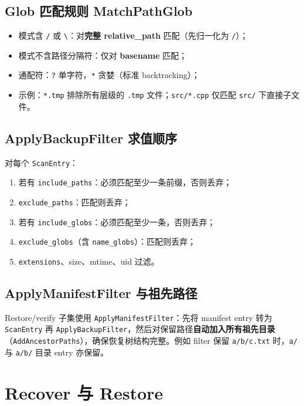 \subsection{Glob 匹配规则 MatchPathGlob}

\begin{designbox}[Glob 语义（关键）]
\begin{itemize}[nosep]
  \item 模式含 \texttt{/} 或 \texttt{\textbackslash}：对\textbf{完整 relative\_path} 匹配（先归一化为 \texttt{/}）；
  \item 模式不含路径分隔符：仅对 \textbf{basename} 匹配；
  \item 通配符：\texttt{?} 单字符，\texttt{*} 贪婪（标准 backtracking）；
  \item 示例：\texttt{*.tmp} 排除所有层级的 \texttt{.tmp} 文件；\texttt{src/*.cpp} 仅匹配 \texttt{src/} 下直接子文件。
\end{itemize}
\end{designbox}

\subsection{ApplyBackupFilter 求值顺序}

对每个 \texttt{ScanEntry}：
\begin{enumerate}
  \item 若有 \texttt{include\_paths}：必须匹配至少一条前缀，否则丢弃；
  \item \texttt{exclude\_paths}：匹配则丢弃；
  \item 若有 \texttt{include\_globs}：必须匹配至少一条，否则丢弃；
  \item \texttt{exclude\_globs}（含 \texttt{name\_globs}）：匹配则丢弃；
  \item \texttt{extensions}、size、mtime、uid 过滤。
\end{enumerate}

\subsection{ApplyManifestFilter 与祖先路径}

Restore/verify 子集使用 \texttt{ApplyManifestFilter}：先将 manifest entry 转为 \texttt{ScanEntry} 再 \texttt{ApplyBackupFilter}，然后对保留路径\textbf{自动加入所有祖先目录}（\texttt{AddAncestorPaths}），确保恢复树结构完整。例如 filter 保留 \texttt{a/b/c.txt} 时，\texttt{a/} 与 \texttt{a/b/} 目录 entry 亦保留。

\section{Recover 与 Restore}

